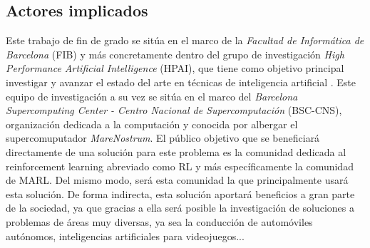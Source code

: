 \subsection{Actores implicados}

Este trabajo de fin de grado se sitúa en el marco de la \emph{Facultad de Informática de Barcelona} (FIB) y más concretamente dentro del grupo de investigación \emph{High Performance Artificial Intelligence} (HPAI), que tiene como objetivo principal investigar y avanzar el estado del arte en técnicas de inteligencia artificial \cite{hpai} \cite{bsc-hpai}. Este equipo de investigación a su vez se sitúa en el marco del \emph{Barcelona Supercomputing Center - Centro Nacional de Supercomputación} (BSC-CNS), organización dedicada a la computación y conocida por albergar el supercomuputador \emph{MareNostrum}. El público objetivo que se beneficiará directamente de una solución para este problema es la comunidad dedicada al reinforcement learning abreviado como RL y más específicamente la comunidad de MARL. Del mismo modo, será esta comunidad la que principalmente usará esta solución. De forma indirecta, esta solución aportará beneficios a gran parte de la sociedad, ya que gracias a ella será posible la investigación de soluciones a problemas de áreas muy diversas, ya sea la conducción de automóviles autónomos, inteligencias artificiales para videojuegos... 




